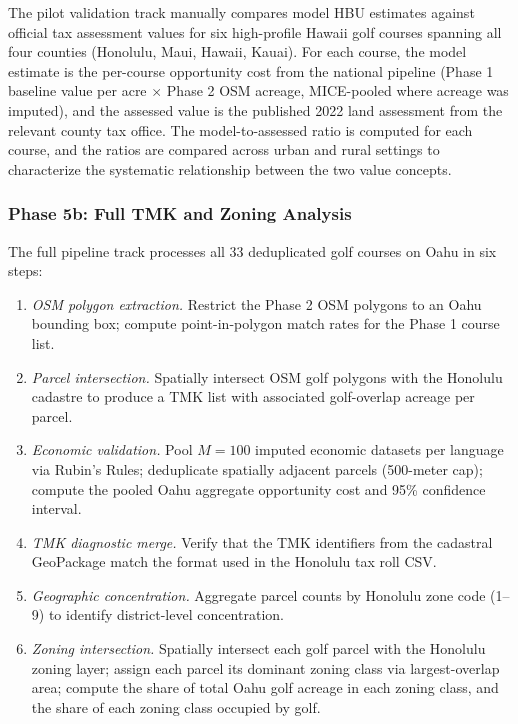 \documentclass[11pt, letterpaper]{article}
\begin{document}
The pilot validation track manually compares model HBU estimates against official tax assessment values for six high-profile Hawaii golf courses spanning all four counties (Honolulu, Maui, Hawaii, Kauai). For each course, the model estimate is the per-course opportunity cost from the national pipeline (Phase 1 baseline value per acre $\times$ Phase 2 OSM acreage, MICE-pooled where acreage was imputed), and the assessed value is the published 2022 land assessment from the relevant county tax office. The model-to-assessed ratio is computed for each course, and the ratios are compared across urban and rural settings to characterize the systematic relationship between the two value concepts.

\subsubsection{Phase 5b: Full TMK and Zoning Analysis}

The full pipeline track processes all 33 deduplicated golf courses on Oahu in six steps:

\begin{enumerate}[leftmargin=*]
    \item \textit{OSM polygon extraction.} Restrict the Phase 2 OSM polygons to an Oahu bounding box; compute point-in-polygon match rates for the Phase 1 course list.
    \item \textit{Parcel intersection.} Spatially intersect OSM golf polygons with the Honolulu cadastre to produce a TMK list with associated golf-overlap acreage per parcel.
    \item \textit{Economic validation.} Pool $M = 100$ imputed economic datasets per language via Rubin's Rules; deduplicate spatially adjacent parcels (500-meter cap); compute the pooled Oahu aggregate opportunity cost and 95\% confidence interval.
    \item \textit{TMK diagnostic merge.} Verify that the TMK identifiers from the cadastral GeoPackage match the format used in the Honolulu tax roll CSV.
    \item \textit{Geographic concentration.} Aggregate parcel counts by Honolulu zone code (1--9) to identify district-level concentration.
    \item \textit{Zoning intersection.} Spatially intersect each golf parcel with the Honolulu zoning layer; assign each parcel its dominant zoning class via largest-overlap area; compute the share of total Oahu golf acreage in each zoning class, and the share of each zoning class occupied by golf.
\end{enumerate}
\end{document}

